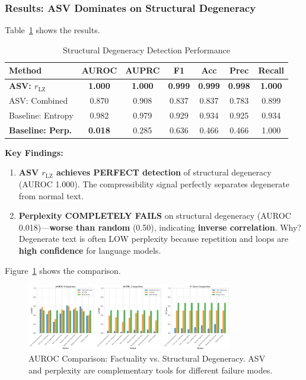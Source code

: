 \documentclass[11pt]{article}
\begin{document}
\subsubsection{Results: ASV Dominates on Structural Degeneracy}

Table~\ref{tab:degeneracy-results} shows the results.

\begin{table}[h]
\centering
\caption{Structural Degeneracy Detection Performance}
\label{tab:degeneracy-results}
\begin{tabular}{lcccccc}
\toprule
\textbf{Method} & \textbf{AUROC} & \textbf{AUPRC} & \textbf{F1} & \textbf{Acc} & \textbf{Prec} & \textbf{Recall} \\
\midrule
\textbf{ASV: $r_{\text{LZ}}$} & \textbf{1.000} & \textbf{1.000} & \textbf{0.999} & \textbf{0.999} & \textbf{0.998} & \textbf{1.000} \\
ASV: Combined & 0.870 & 0.908 & 0.837 & 0.837 & 0.783 & 0.899 \\
Baseline: Entropy & 0.982 & 0.979 & 0.929 & 0.934 & 0.925 & 0.934 \\
\textbf{Baseline: Perp.} & \textbf{0.018} & 0.285 & 0.636 & 0.466 & 0.466 & 1.000 \\
\bottomrule
\end{tabular}
\end{table}

\textbf{Key Findings:}
\begin{enumerate}
\item \textbf{ASV $r_{\text{LZ}}$ achieves PERFECT detection} of structural degeneracy (AUROC 1.000). The compressibility signal perfectly separates degenerate from normal text.
\item \textbf{Perplexity COMPLETELY FAILS} on structural degeneracy (AUROC 0.018)---\textbf{worse than random} (0.50), indicating \textbf{inverse correlation}. Why? Degenerate text is often LOW perplexity because repetition and loops are \textbf{high confidence} for language models.
\end{enumerate}

Figure~\ref{fig:degeneracy-comparison} shows the comparison.

\begin{figure}[h]
\centering
\includegraphics[width=0.8\textwidth]{figures/comparison_bars.png}
\caption{AUROC Comparison: Factuality vs. Structural Degeneracy. ASV and perplexity are complementary tools for different failure modes.}
\label{fig:degeneracy-comparison}
\end{figure}
\end{document}
